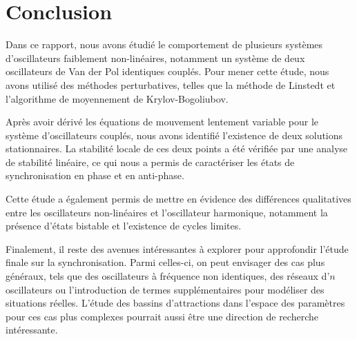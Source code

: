 \chapter{Conclusion}
%
Dans ce rapport, nous avons étudié le comportement de plusieurs systèmes d'oscillateurs faiblement non-linéaires, notamment un système de deux oscillateurs de Van der Pol identiques couplés.
Pour mener cette étude, nous avons utilisé des méthodes perturbatives, telles que la méthode de Linstedt et l'algorithme de moyennement de Krylov-Bogoliubov.

Après avoir dérivé les équations de mouvement lentement variable pour le système d'oscillateurs couplés, nous avons identifié l'existence de deux solutions stationnaires.
La stabilité locale de ces deux points a été vérifiée par une analyse de stabilité linéaire, ce qui nous a permis de 
caractériser les états de synchronisation en phase et en anti-phase.

Cette étude a également permis de mettre en évidence des différences qualitatives entre les oscillateurs non-linéaires et l'oscillateur harmonique, notamment la présence d'états bistable et l'existence de cycles limites.

Finalement, il reste des avenues intéressantes à explorer pour approfondir l'étude finale sur la synchronisation. Parmi celles-ci,
on peut envisager des cas plus généraux, tels que des oscillateurs à fréquence non identiques, des réseaux d'$n$ oscillateurs ou l'introduction de termes supplémentaires pour modéliser des situations réelles.
L'étude des bassins d'attractions dans l'espace des paramètres pour ces cas plus complexes pourrait aussi être une direction de recherche intéressante.